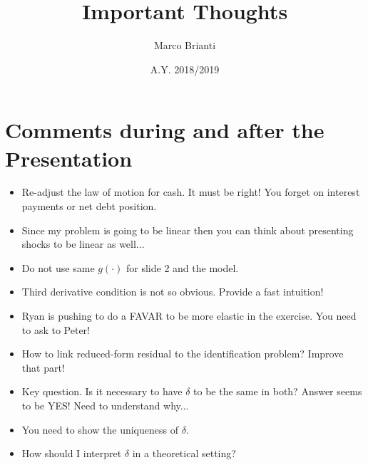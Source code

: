 \documentclass{article}
\title{Important Thoughts}
\author{Marco Brianti}
\date{A.Y. 2018/2019}
\begin{document}
	\large{

\maketitle

\section*{Comments during and after the Presentation}

\begin{itemize}
	\item Re-adjust the law of motion for cash. It must be right! You forget on interest payments or net debt position.
	\item Since my problem is going to be linear then you can think about presenting shocks to be linear as well...
	\item Do not use same $g(\cdot)$ for slide 2 and the model.
	\item Third derivative condition is not so obvious. Provide a fast intuition!
	\item Ryan is pushing to do a FAVAR to be more elastic in the exercise. You need to ask to Peter!
	\item How to link reduced-form residual to the identification problem? Improve that part!
	\item Key question. Is it necessary to have $\delta$ to be the same in both? Answer seems to be YES! Need to understand why...
	\item You need to show the uniqueness of $\delta$.
	\item How should I interpret $\delta$ in a theoretical setting?
\end{itemize}


}
\end{document}
